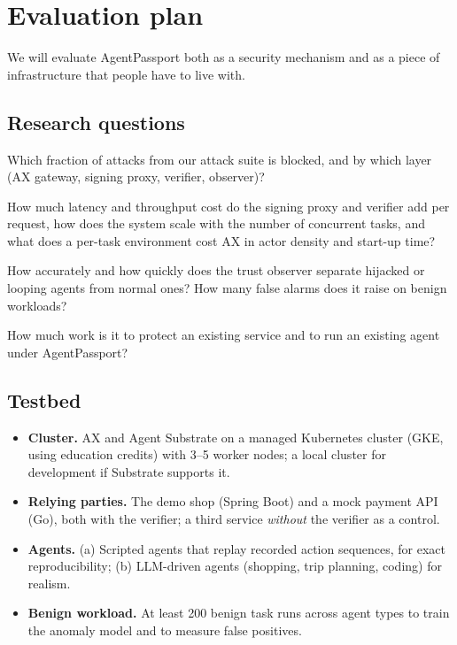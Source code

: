 \section{Evaluation plan}\label{sec:eval}

We will evaluate AgentPassport both as a security mechanism and as a piece of infrastructure that people have to live with.

\subsection{Research questions}

\begin{description}[leftmargin=0pt,labelindent=0pt]
  \item[RQ1 (Effectiveness)] Which fraction of attacks from our attack suite is blocked, and by which layer (AX gateway, signing proxy, verifier, observer)?
  \item[RQ2 (Overhead)] How much latency and throughput cost do the signing proxy and verifier add per request, how does the system scale with the number of concurrent tasks, and what does a per-task environment cost AX in actor density and start-up time?
  \item[RQ3 (Detection quality)] How accurately and how quickly does the trust observer separate hijacked or looping agents from normal ones? How many false alarms does it raise on benign workloads?
  \item[RQ4 (Adoption effort)] How much work is it to protect an existing service and to run an existing agent under AgentPassport?
\end{description}

\subsection{Testbed}

\begin{itemize}
  \item \textbf{Cluster.} AX and Agent Substrate on a managed Kubernetes cluster (GKE, using education credits) with 3--5 worker nodes; a local  cluster for development if Substrate supports it.
  \item \textbf{Relying parties.} The demo shop (Spring Boot) and a mock payment API (Go), both with the verifier; a third service \emph{without} the verifier as a control.
  \item \textbf{Agents.} (a) Scripted agents that replay recorded action sequences, for exact reproducibility; (b) LLM-driven agents (shopping, trip planning, coding) for realism.
  \item \textbf{Benign workload.} At least 200 benign task runs across agent types to train the anomaly model and to measure false positives.
\end{itemize}

